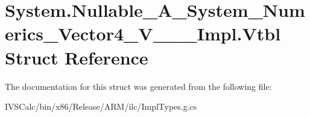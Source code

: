 \hypertarget{struct_system_1_1_nullable___a___system___numerics___vector4___v_______impl_1_1_vtbl}{}\section{System.\+Nullable\+\_\+\+A\+\_\+\+System\+\_\+\+Numerics\+\_\+\+Vector4\+\_\+\+V\+\_\+\+\_\+\+\_\+\+Impl.\+Vtbl Struct Reference}
\label{struct_system_1_1_nullable___a___system___numerics___vector4___v_______impl_1_1_vtbl}


The documentation for this struct was generated from the following file\+:\begin{DoxyCompactItemize}
\item 
I\+V\+S\+Calc/bin/x86/\+Release/\+A\+R\+M/ilc/Impl\+Types.\+g.\+cs\end{DoxyCompactItemize}
